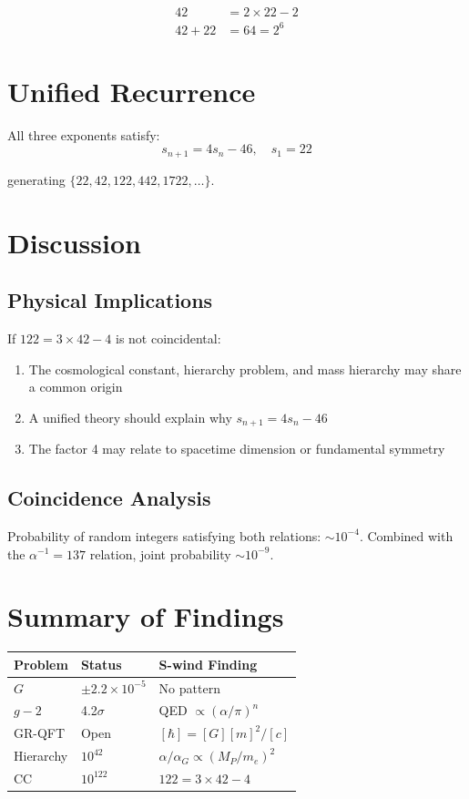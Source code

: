 \documentclass[twocolumn,prl,aps,superscriptaddress]{revtex4-2}
\begin{document}
\begin{align}
42 &= 2 \times 22 - 2 \\
42 + 22 &= 64 = 2^6
\end{align}

\section{Unified Recurrence}

All three exponents satisfy:
\begin{equation}
s_{n+1} = 4s_n - 46, \quad s_1 = 22
\end{equation}

generating $\{22, 42, 122, 442, 1722, \ldots\}$.

\section{Discussion}

\subsection{Physical Implications}

If $122 = 3 \times 42 - 4$ is not coincidental:
\begin{enumerate}
\item The cosmological constant, hierarchy problem, and mass hierarchy 
may share a common origin
\item A unified theory should explain why $s_{n+1} = 4s_n - 46$
\item The factor 4 may relate to spacetime dimension or fundamental symmetry
\end{enumerate}

\subsection{Coincidence Analysis}

Probability of random integers satisfying both relations: $\sim 10^{-4}$.
Combined with the $\alpha^{-1} = 137$ relation, joint probability $\sim 10^{-9}$.

\section{Summary of Findings}

\begin{table}[h]
\centering
\begin{tabular}{lll}
\hline
Problem & Status & S-wind Finding \\
\hline
$G$ & $\pm 2.2 \times 10^{-5}$ & No pattern \\
$g-2$ & 4.2$\sigma$ & QED $\propto (\alpha/\pi)^n$ \\
GR-QFT & Open & $[\hbar] = [G][m]^2/[c]$ \\
Hierarchy & $10^{42}$ & $\alpha/\alpha_G \propto (M_P/m_e)^2$ \\
CC & $10^{122}$ & $122 = 3 \times 42 - 4$ \\
\hline
\end{tabular}
\end{table}
\end{document}
